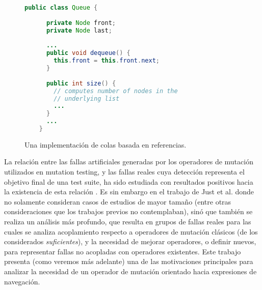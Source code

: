 \begin{figure}[t]
	\begin{lstlisting}[frame=tlrb, mathescape=true, language=Java]
    public class Queue {
	
      private Node front;
      private Node last;
	
      ...
      public void dequeue() {
        this.front = this.front.next;
      }
	
      public int size() {
        // computes number of nodes in the 
        // underlying list
        ...
      }
      ...
    }
	\end{lstlisting}
	\caption{Una implementaci\'on de colas basada en referencias.}
	\label{figures.motivation.queue-class}
\end{figure}

La relaci\'on entre las fallas artificiales generadas por los operadores de mutaci\'on utilizados en mutation testing, y las fallas reales cuya detecci\'on representa el objetivo final de una test suite, ha sido estudiada con resultados positivos hacia la existencia de esta relaci\'on \cite{bibliography.mutation.evaluation.DaranT96, bibliography.mutation.evaluation.isMutationAppropiateAndrewsBL05, bibliography.mutation.evaluation.mutationInTestingExperimentsNaminK11}. Es sin embargo en el trabajo de Just et al. \cite{bibliography.mutation.evaluation.valid-substitute} donde no solamente consideran casos de estudios de mayor tama\~no (entre otras consideraciones que los trabajos previos no contemplaban), sin\'o que tambi\'en se realiza un an\'alisis m\'as profundo, que resulta en grupos de fallas reales para las cuales se analiza acoplamiento respecto a operadores de mutaci\'on cl\'asicos (de los considerados \emph{suficientes}), y la necesidad de mejorar operadores, o definir nuevos, para representar fallas no acopladas con operadores existentes. Este trabajo presenta (como veremos m\'as adelante) una de las motivaciones principales para analizar la necesidad de un operador de mutaci\'on orientado hacia expresiones de navegaci\'on.

